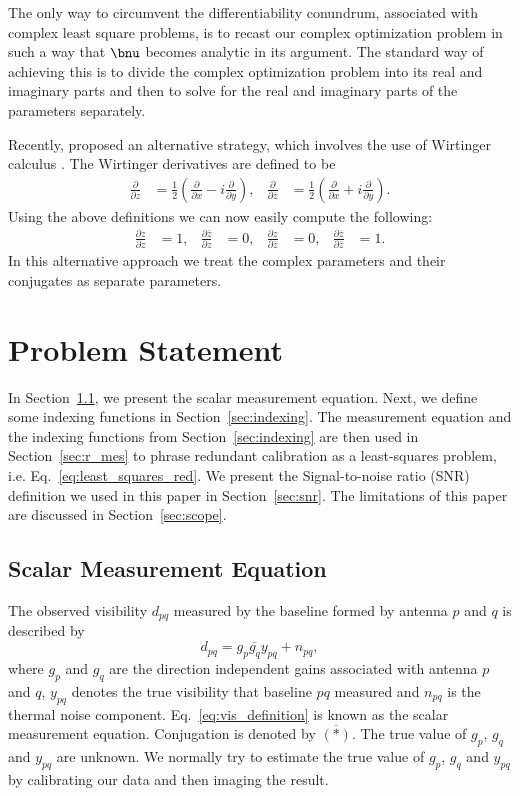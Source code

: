 \documentclass[useAMS,usenatbib]{mn2e}
\newcommand{\conj}[1]{\overline{#1}}
\begin{document}
The only way to circumvent the differentiability conundrum, associated with complex least square problems, is to recast our complex optimization problem in such a way that $\bnu$ becomes analytic in its argument.
The standard way of achieving this is to divide the complex optimization problem into its real and imaginary parts and then to solve for the real and imaginary parts of the parameters separately.

Recently, \citet{Sorber2012} proposed an alternative strategy, which involves the use of Wirtinger calculus \citep{Wirtinger1927}. The Wirtinger derivatives 
are defined to be 
\begin{align}
\label{eq:wir}
\frac{\partial}{\partial z} &= \frac{1}{2}\left ( \frac{\partial}{\partial x} -  i \frac{\partial}{\partial y} \right ),&\frac{\partial}{\partial \conj{z}} &= \frac{1}{2}\left ( \frac{\partial}{\partial x} +  i \frac{\partial}{\partial y} \right ). 
\end{align}
Using the above definitions we can now easily compute the following:
\begin{align}
\frac{\partial z}{\partial z} & = 1, & \frac{\partial \conj{z}}{\partial z}&=0, & \frac{\partial z}{\partial \conj{z}} & = 0, & \frac{\partial \conj{z}}{\partial \conj{z}}&=1.
\end{align}
In this alternative approach we treat the complex parameters and their conjugates as separate parameters.

\section{Problem Statement}
\label{sec:p_statement}
In Section~\ref{sec:s_mes}, we present the scalar measurement equation. Next, we define some indexing functions in Section~\ref{sec:indexing}. The measurement 
equation and the indexing functions from Section~\ref{sec:indexing} are then used in Section~\ref{sec:r_mes} to phrase redundant calibration as a least-squares problem, i.e. Eq.~\eqref{eq:least_squares_red}.
We present the Signal-to-noise ratio (SNR) definition we used in this paper in Section~\ref{sec:snr}. The limitations of this paper are discussed in Section~\ref{sec:scope}.

\subsection{Scalar Measurement Equation}
\label{sec:s_mes}
The observed visibility $d_{pq}$ measured by the baseline formed by antenna $p$ and $q$ is described by
\begin{equation}
\label{eq:vis_definition}
d_{pq} = g_{p}\conj{g_q}y_{pq} + n_{pq},
\end{equation}
where $g_{p}$ and $g_{q}$ are the direction independent gains associated with antenna $p$ and $q$, $y_{pq}$ denotes the true visibility that baseline $pq$ measured
and $n_{pq}$ is the thermal noise component. Eq.~\eqref{eq:vis_definition} is known as the scalar measurement equation. Conjugation is denoted by $\conj{(*)}$. The true value of $g_p$, $g_q$ and $y_{pq}$ are unknown. We normally try to estimate the true value of
$g_p$, $g_q$ and $y_{pq}$ by calibrating our data and then imaging the result.
\end{document}
